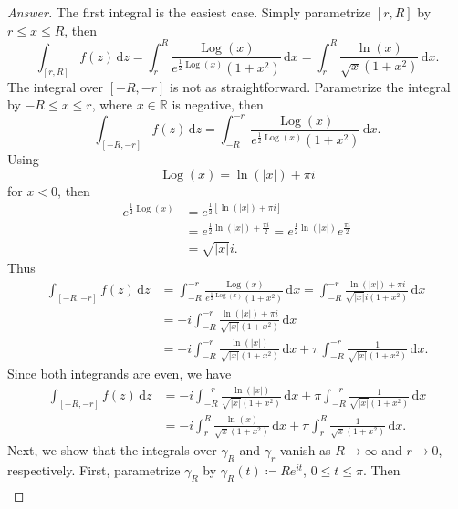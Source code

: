 \documentclass[12pt]{article}
\newcommand{\real}{\mathbb{R}}
\newcommand\paren[1]{\left( #1 \right)}
\newcommand{\sqbrack}[1]{\left [ #1 \right ]}
\newcommand{\abs}[1]{\left| #1 \right|}
\renewcommand{\i}[4]{\int_{#1}^{#2} {#3} \, \mathrm{d} {#4} }
\theoremstyle{definition}
\DeclareMathOperator\Log{Log}
\begin{document}
\begin{proof}[Answer]
    The first integral is the easiest case. Simply parametrize $[r,R]$ by $r \leq x \leq R$, then 
    \[
        \i{[r,R]}{}{f(z)}{z} = \i{r}{R}{ \frac{\Log(x)}{e^{\frac{1}{2}\Log(x)} \paren{ 1 + x^2 } } }{x} = \i{r}{R}{ \frac{\ln(x)}{\sqrt{x} \paren{ 1 + x^2} }  }{x} . 
    \]
    The integral over $[-R,-r]$ is not as straightforward. Parametrize the integral by $-R \leq x \leq r$, where $x \in \real$ is negative, then 
    \[
        \i{[-R,-r]}{}{f(z)}{z} = \i{-R}{-r}{ \frac{\Log(x)}{e^{\frac{1}{2}\Log(x)} \paren{ 1 + x^2 } } }{x} . 
    \]
    Using 
    \[
        \Log(x) = \ln \paren{ \abs{x} } + \pi i 
    \]
    for $x < 0$, then 
    \begin{align*}
        e^{ \frac{1}{2} \Log(x) } & = e^{ \frac{1}{2} \sqbrack{ \ln \paren{ \abs{x} } + \pi i } } \\ 
        & = e^{ \frac{1}{2} \ln \paren{ \abs{x} } + \frac{\pi i}{2} } = e^{ \frac{1}{2} \ln \paren{ \abs{x} } } e^{ \frac{\pi i}{2} } \\ 
        & = \sqrt{ \abs{x} } i . 
    \end{align*}
    Thus 
    \begin{align*}
        \i{[-R,-r]}{}{f(z)}{z} & = \i{-R}{-r}{ \frac{\Log(x)}{e^{\frac{1}{2}\Log(x)} \paren{ 1 + x^2 } } }{x} = \i{-R}{-r}{ \frac{\ln \paren{ \abs{x} } + \pi i}{\sqrt{\abs{x}} i \paren{ 1 + x^2 } } }{x} \\ 
        & = -i \i{-R}{-r}{ \frac{\ln \paren{ \abs{x} } + \pi i}{\sqrt{\abs{x}} \paren{ 1 + x^2 } } }{x} \\ 
        & = -i \i{-R}{-r}{ \frac{ \ln \paren{ \abs{x} } }{ \sqrt{ \abs{x} } \paren{ 1 + x^2} } }{x} + \pi \i{-R}{-r}{ \frac{ 1 }{ \sqrt{ \abs{x} } \paren{ 1 + x^2} } }{x} .
    \end{align*}
    Since both integrands are even, we have 
    \begin{align*}
        \i{[-R,-r]}{}{f(z)}{z} & = -i \i{-R}{-r}{ \frac{ \ln \paren{ \abs{x} } }{ \sqrt{ \abs{x} } \paren{ 1 + x^2} } }{x} + \pi \i{-R}{-r}{ \frac{ 1 }{ \sqrt{ \abs{x} } \paren{ 1 + x^2} } }{x} \\ 
        & = -i \i{r}{R}{ \frac{ \ln(x) }{ \sqrt{ x } \paren{ 1 + x^2} } }{x} + \pi \i{r}{R}{ \frac{ 1 }{ \sqrt{ x } \paren{ 1 + x^2} } }{x} . 
    \end{align*}
    Next, we show that the integrals over $\gamma_R$ and $\gamma_r$ vanish as $R \to \infty$ and $r \to 0$, respectively. First, parametrize $\gamma_R$ by $\gamma_R(t) \coloneqq Re^{it}$, $0 \leq t \leq \pi$. Then 
    \begin{align*}

\end{align*}
\end{proof}
\end{document}

